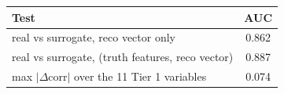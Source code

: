 \begin{tabular}{lc}
\toprule
Test & AUC \\
\midrule
real vs surrogate, reco vector only & 0.862 \\
real vs surrogate, (truth features, reco vector) & 0.887 \\
\midrule
max $|\Delta$corr$|$ over the 11 Tier 1 variables & 0.074 \\
\bottomrule
\end{tabular}
